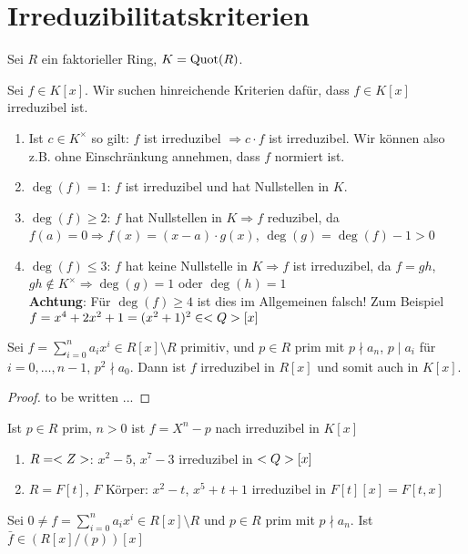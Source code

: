 \section{Irreduzibilitatskriterien}

Sei $R$ ein faktorieller Ring, $K = \operatorname{Quot}(R)$.

\begin{remark}
	Sei $f \in K[x]$. Wir suchen hinreichende Kriterien dafür, dass $f \in K[x]$ irreduzibel ist.
	\begin{enumerate}[label=(\alph*)]
		\item Ist $c \in K^{\times}$ so gilt: $f$ ist irreduzibel $\Longrightarrow c \cdot f$ ist irreduzibel. Wir können also z.B. ohne Einschränkung annehmen, dass $f$ normiert ist.
		\item $\deg(f) = 1$: $f$ ist irreduzibel und hat Nullstellen in $K$.
		\item $\deg(f) \ge 2$: $f$ hat Nullstellen in $K \Rightarrow f$ reduzibel, da $f(a) = 0 \Rightarrow f(x) = (x-a)\cdot g(x)$, $\deg(g) = \deg(f) - 1 > 0$
		\item $\deg(f) \le 3$: $f$ hat keine Nullstelle in $K \Rightarrow f$ ist irreduzibel, da $f=gh$, $gh \not \in K^{\times}\Rightarrow \deg(g) = 1$ oder $\deg(h) = 1$\\
		\textbf{Achtung}: Für $\deg(f) \ge 4$ ist dies im Allgemeinen falsch! Zum Beispiel $f = x^4 + 2x^2 + 1 = (x^2 +1)^2 \in <Q>[x]$
	\end{enumerate}
\end{remark}

\begin{proposition}
	Sei $f = \sum_{i=0}^{n} a_i x^i \in R[x]\setminus R$ primitiv, und $p \in R$ prim mit $p\nmid a_n$, $p \mid a_i$ für $i = 0, \dots,n-1$, $p^2 \nmid a_0$. Dann ist $f$ irreduzibel in $R[x]$ und somit auch in $K[x]$.
\end{proposition}

\begin{proof}
	to be written ...
\end{proof}

\begin{example}
	Ist $p \in R$ prim, $n > 0$ ist $f = X^n-p$ nach  irreduzibel in $K[x]$
	\begin{enumerate}[label=(\alph*)]
		\item $R = <Z>$: $x^2 -5$, $x^7 - 3$ irreduzibel in $<Q>[x]$
		\item $R = F[t]$, $F$ Körper: $x^2-t$, $x^5 + t +1$ irreduzibel in $F[t][x] = F[t,x]$
	\end{enumerate}
\end{example}

\begin{proposition}[Reduktionskriterium]
	Sei $0 \neq f = \sum_{i=0}^{n} a_i x^i \in R[x]\setminus R$ und $p \in R$ prim mit $p \nmid a_n$. Ist $\bar{f} \in (R[x]/(p))[x]$
\end{proposition}